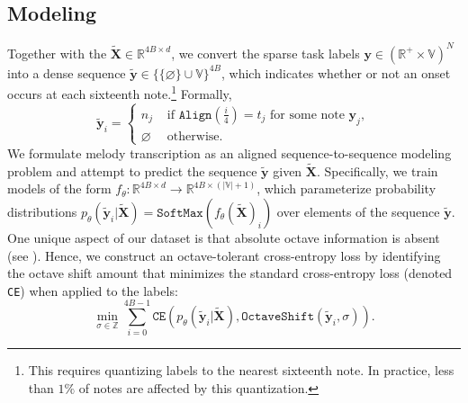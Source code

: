 \subsection{Modeling}
\label{sec:modeling}

Together with the \beatpooling{} ${\tilde{\bm{X}} \in \mathbb{R}^{4B\times d}}$, we convert 
the sparse task labels ${\bm{y} \in (\mathbb{R}^+ \times \mathbb{V})^N}$ into 
a dense sequence  
${\tilde{\bm{y}} \in \{\{\varnothing\}\cup\mathbb{V}\}^{4B}}$,
which indicates whether or not an onset occurs at each sixteenth note.\footnote{This requires quantizing labels to the nearest sixteenth note. In practice, less than $1\%$ of notes are affected by this quantization.} Formally, 
\[
\tilde{\bm{y}}_i =
\begin{cases}
n_j & \text{ if $\texttt{Align}(\frac{i}{4}) = t_j$ for some note $\bm{y}_j$}, \\
\varnothing & \text{ otherwise}.
\end{cases}
\]
We formulate melody transcription as an aligned sequence-to-sequence modeling problem and 
attempt to predict the sequence $\tilde{\bm{y}}$ given $\tilde{\bm{X}}$. Specifically, we train models of the form ${f_{\theta} : \mathbb{R}^{4B \times d} \to \mathbb{R}^{4B \times (|\mathbb{V}| + 1)}}$, which parameterize probability distributions  ${p_\theta(\tilde{\bm{y}}_i|\bm{\tilde{X}}) = \texttt{SoftMax}(f_{\theta}(\tilde{\bm{X}})_i)}$ over elements of the sequence $\tilde{\bm{y}}$.
One unique aspect of our dataset is that absolute octave information is absent (see ). 
Hence, we construct an octave-tolerant cross-entropy loss by 
identifying the octave shift amount that minimizes the standard cross-entropy loss (denoted \texttt{CE}) when applied to the labels:
\begin{equation*}
\operatorname*{min}_{\sigma \in \mathbb{Z}} \sum_{i=0}^{4B-1} \texttt{CE}(p_\theta(\tilde{\bm{y}}_i|\bm{\tilde{X}}), \texttt{OctaveShift}(\tilde{\bm{y}}_i, \sigma)).
\end{equation*}

